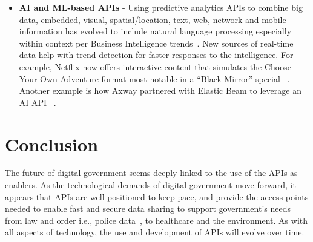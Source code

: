 \begin{itemize}
	\item \textbf{AI and ML-based APIs} - Using predictive analytics APIs to combine big data, embedded, visual, spatial/location, text, web, network and mobile information has evolved to include natural language processing especially within context per Business Intelligence trends~\citep{bisurvey}.
	New sources of real-time data help with trend detection for faster responses to the intelligence. For example, Netflix now offers interactive content that simulates the Choose Your Own Adventure format most notable in a  “Black Mirror” special ~\citep{bms}. Another example is how Axway partnered with Elastic Beam to leverage an AI API ~\citep{axway}.
\end{itemize}

\section{Conclusion}

The future of digital government seems deeply linked to the use of the APIs as
enablers. As the technological demands of digital government move forward, it
appears that APIs are well positioned to keep pace, and provide the access points
needed to enable fast and secure data sharing to support government’s needs from
law and order i.e., police data~\citep{police_data}, to healthcare and the environment. As with all aspects of technology,
the use and development of APIs will evolve over time.